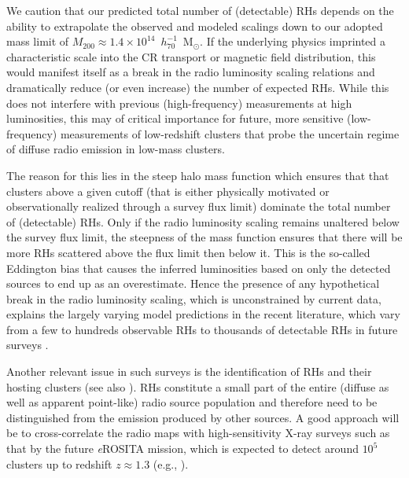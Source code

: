 \documentclass[useAMS,usenatbib]{mn2e}
\begin{document}

We caution that our predicted total number of (detectable) RHs depends on the
ability to extrapolate the observed and modeled scalings down to our adopted
mass limit of $M_{200}\approx1.4\times10^{14}$~$h_{70}^{-1}$~M$_{\odot}$. If the
underlying physics imprinted a characteristic scale into the CR transport or
magnetic field distribution, this would manifest itself as a break in the radio
luminosity scaling relations and dramatically reduce (or even increase) the
number of expected RHs.  While this does not interfere with previous
(high-frequency) measurements at high luminosities, this may of critical
importance for future, more sensitive (low-frequency) measurements of
low-redshift clusters that probe the uncertain regime of diffuse radio emission
in low-mass clusters.

The reason for this lies in the steep halo mass function which ensures that that
clusters above a given cutoff (that is either physically motivated or
observationally realized through a survey flux limit) dominate the total number
of (detectable) RHs. Only if the radio luminosity scaling remains unaltered
below the survey flux limit, the steepness of the mass function ensures that
there will be more RHs scattered above the flux limit then below it. This is the
so-called Eddington bias that causes the inferred luminosities based on only the
detected sources to end up as an overestimate. Hence the presence of any
hypothetical break in the radio luminosity scaling, which is unconstrained by
current data, explains the largely varying model predictions in the recent
literature, which vary from a few to hundreds observable RHs
\citep{2010A&A...509A..68C,2012arXiv1210.1020C,2011arXiv1110.2786S} to thousands 
of detectable RHs in future surveys \citep{2002A&A...396...83E}. 

Another relevant issue in such surveys is the identification of RHs and their
hosting clusters (see also \citealp{2010A&A...509A..68C}). RHs constitute a
small part of the entire (diffuse as well as apparent point-like) radio source
population and therefore need to be distinguished from the emission produced by
other sources. A good approach will be to cross-correlate the radio maps with
high-sensitivity X-ray surveys such as that by the future \emph{e}ROSITA mission, which
is expected to detect around $10^{5}$ clusters up to redshift $z \approx 1.3$
(e.g., \citealp{2011MSAIS..17..159C}).
\end{document}
